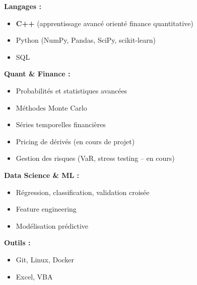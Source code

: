 \textbf{Langages :}
\begin{itemize}
    \item \textbf{C++} (apprentissage avancé orienté finance quantitative)
    \item Python (NumPy, Pandas, SciPy, scikit-learn)
    \item SQL
\end{itemize}

\textbf{Quant \& Finance :}
\begin{itemize}
    \item Probabilités et statistiques avancées
    \item Méthodes Monte Carlo
    \item Séries temporelles financières
    \item Pricing de dérivés (en cours de projet)
    \item Gestion des risques (VaR, stress testing -- en cours)
\end{itemize}

\textbf{Data Science \& ML :}
\begin{itemize}
    \item Régression, classification, validation croisée
    \item Feature engineering
    \item Modélisation prédictive
\end{itemize}

\textbf{Outils :}
\begin{itemize}
    \item Git, Linux, Docker
    \item Excel, VBA
\end{itemize}
